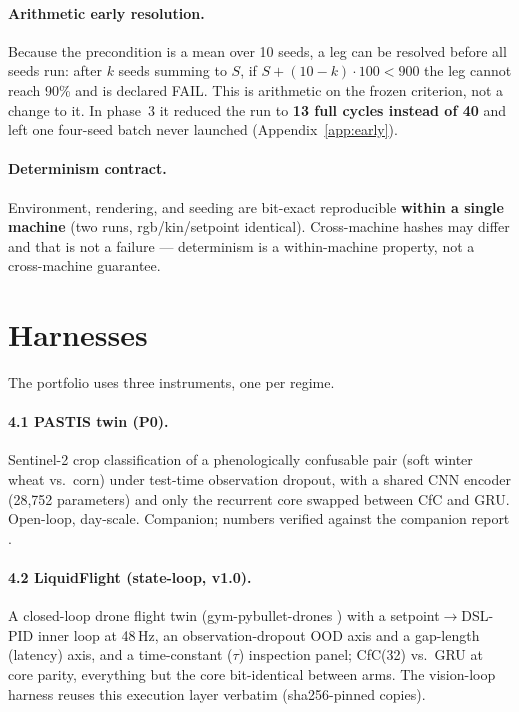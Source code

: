 \documentclass[11pt]{article}
\begin{document}
\paragraph{Arithmetic early resolution.} Because the precondition is a mean over 10 seeds, a leg can be resolved before all seeds run: after $k$ seeds summing to $S$, if $S + (10-k)\cdot 100 < 900$ the leg cannot reach 90\% and is declared FAIL. This is arithmetic on the frozen criterion, not a change to it. In phase~3 it reduced the run to \textbf{13 full cycles instead of 40} and left one four-seed batch never launched (Appendix~\ref{app:early}).

\paragraph{Determinism contract.} Environment, rendering, and seeding are bit-exact reproducible \textbf{within a single machine} (two runs, rgb/kin/setpoint identical). Cross-machine hashes may differ and that is not a failure --- determinism is a within-machine property, not a cross-machine guarantee.

\section{Harnesses}
The portfolio uses three instruments, one per regime.

\paragraph{4.1 PASTIS twin (P0).} Sentinel-2 crop classification of a phenologically confusable pair (soft winter wheat vs.\ corn) under test-time observation dropout, with a shared CNN encoder (28{,}752 parameters) and only the recurrent core swapped between CfC and GRU. Open-loop, day-scale. Companion; numbers verified against the companion report \citep{zydziak2026p0}.

\paragraph{4.2 LiquidFlight (state-loop, v1.0).} A closed-loop drone flight twin (gym-pybullet-drones \citep{panerati2021gym}) with a setpoint$\to$DSL-PID inner loop at 48\,Hz, an observation-dropout OOD axis and a gap-length (latency) axis, and a time-constant ($\tau$) inspection panel; CfC(32) vs.\ GRU at core parity, everything but the core bit-identical between arms. The vision-loop harness reuses this execution layer verbatim (sha256-pinned copies).
\end{document}
